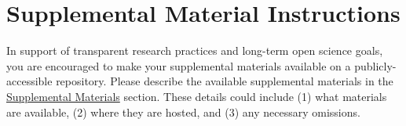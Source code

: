 \section{Supplemental Material Instructions}
\label{sec:supplement_inst}

In support of transparent research practices and long-term open science goals, you are encouraged to make your supplemental materials available on a publicly-accessible repository.
Please describe the available supplemental materials in the \hyperref[sec:supplemental_materials]{Supplemental Materials} section.
These details could include (1) what materials are available, (2) where they are hosted, and (3) any necessary omissions.
